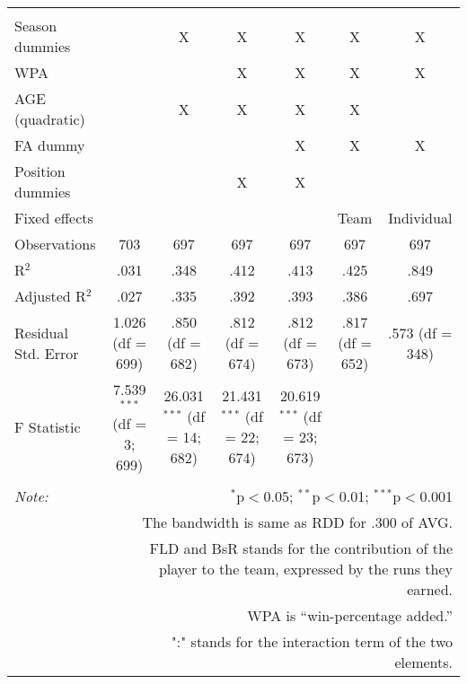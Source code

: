 \begin{table}[H]
\begin{tabular}{@{\extracolsep{5pt}}lcccccc}
  & & & & & & \\
\hline \\[-1.8ex]
Season dummies &  & X & X & X & X & X \\
WPA & & & X & X & X & X  \\
AGE (quadratic) &  & X & X & X & X &  \\
FA dummy &  &  &  & X & X & X \\
Position dummies &  &  & X & X &  &  \\
Fixed effects &  &  &  &  & Team & Individual \\
Observations & 703 & 697 & 697 & 697 & 697 & 697 \\
R$^{2}$ & .031 & .348 & .412 & .413 & .425 & .849 \\
Adjusted R$^{2}$ & .027 & .335 & .392 & .393 & .386 & .697 \\
Residual Std. Error & 1.026 (df = 699) & .850 (df = 682) & .812 (df = 674) & .812 (df = 673) & .817 (df = 652) & .573 (df = 348) \\
F Statistic & 7.539$^{***}$ (df = 3; 699) & 26.031$^{***}$ (df = 14; 682) & 21.431$^{***}$ (df = 22; 674) & 20.619$^{***}$ (df = 23; 673) &  &  \\
\hline
\hline \\[-1.8ex]
\textit{Note:}  & \multicolumn{6}{r}{$^{*}$p$<$0.05; $^{**}$p$<$0.01; $^{***}$p$<$0.001} \\
& \multicolumn{6}{r}{The bandwidth is same as RDD for .300 of AVG.} \\
& \multicolumn{6}{r}{FLD and BsR stands for the contribution of the player to the team, expressed by the runs they earned.} \\
& \multicolumn{6}{r}{WPA is ``win-percentage added.''} \\
& \multicolumn{6}{r}{":" stands for the interaction term of the two elements.} \\
\end{tabular}
\end{table}
